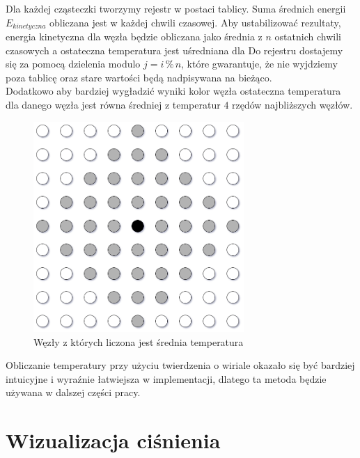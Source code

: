 \documentclass[12pt, letterpaper]{report}
\begin{document}
    Dla każdej cząsteczki tworzymy rejestr w postaci tablicy. 
    Suma średnich energii $E_{kinetyczna}$ obliczana jest w każdej chwili czasowej.
    Aby ustabilizować rezultaty, energia kinetyczna dla węzła będzie obliczana jako 
    średnia z $n$ ostatnich chwili czasowych a ostateczna temperatura jest uśredniana dla 
    Do rejestru dostajemy się za pomocą dzielenia modulo $j = i \, \%  \, n$, które gwarantuje, 
    że nie wyjdziemy poza tablicę oraz stare wartości będą nadpisywana na bieżąco. \\

    Dodatkowo aby bardziej wygładzić wyniki kolor węzła ostateczna temperatura dla danego węzła 
    jest równa średniej z temperatur $4$ rzędów najbliższych węzłów.

    \begin{figure}[h]
        \centering
        \includegraphics[width=8cm]{avg.drawio}
        \caption{Węzły z których liczona jest średnia temperatura}
    \end{figure}

    Obliczanie temperatury przy użyciu twierdzenia o wiriale okazało się być bardziej intuicyjne i
    wyraźnie łatwiejsza w implementacji, dlatego ta metoda będzie używana w dalszej części pracy.

    \section{Wizualizacja ciśnienia}
\end{document}
